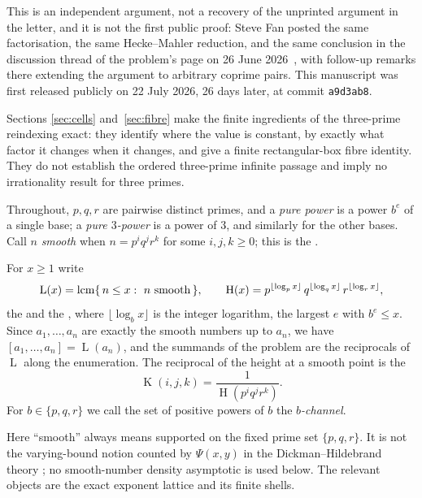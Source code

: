\documentclass[11pt]{article}
\newcommand{\hgt}{\operatorname{H}}
\newcommand{\Lprefix}{\operatorname{L}}
\newcommand{\Kernel}{\operatorname{K}}
\begin{document}
This is an independent argument,
not a recovery of the unprinted argument in the letter, and it is not the
first public proof: Steve Fan posted the same factorisation, the same
Hecke--Mahler reduction, and the same conclusion in the discussion thread of
the problem's page on 26 June 2026~\cite{fan2026comment}, with follow-up
remarks there extending the argument to arbitrary coprime pairs.  This
manuscript was first released publicly on 22 July 2026, 26 days later, at
commit \texttt{a9d3ab8}.

Sections
\ref{sec:cells} and~\ref{sec:fibre} make the finite ingredients of the
three-prime reindexing exact: they identify where the value is constant, by
exactly what factor it changes when it changes, and give a finite
rectangular-box fibre identity.  They do not establish the ordered three-prime
infinite passage and imply no irrationality result for three primes.

Throughout, $p,q,r$ are pairwise distinct primes, and a \emph{pure power} is a
power $b^{e}$ of a single base; a \emph{pure $3$-power} is a power of $3$, and
similarly for the other bases.  Call $n$ \emph{smooth} when
$n=p^{i}q^{j}r^{k}$ for some $i,j,k\ge0$; this is the
.

For $x\ge1$ write
\[
 \Lprefix(x)=\lcm\{\,n\le x:\ n\ \text{smooth}\,\},
 \qquad
 \hgt(x)=p^{\lfloor\log_p x\rfloor}\,q^{\lfloor\log_q x\rfloor}\,
 r^{\lfloor\log_r x\rfloor},
\]
the
 and the
, where $\lfloor\log_b x\rfloor$ is the integer logarithm, the largest
$e$ with $b^{e}\le x$.  Since $a_1,\ldots,a_n$ are exactly the smooth numbers
up to $a_n$, we have $[a_1,\ldots,a_n]=\Lprefix(a_n)$, and the summands of the
problem are the reciprocals of $\Lprefix$ along the enumeration.  The
reciprocal of the height at a smooth point is the
\[
 \Kernel(i,j,k)=\frac{1}{\hgt(p^{i}q^{j}r^{k})} .
\]
For $b\in\{p,q,r\}$ we call the set of positive powers of $b$ the \emph{$b$-channel}.

Here ``smooth'' always means supported on the fixed prime set
\(\{p,q,r\}\).  It is not the varying-bound notion counted by
\(\Psi(x,y)\) in the Dickman--Hildebrand theory
\cite[Theorem~1]{hildebrand1986}; no smooth-number density asymptotic is used
below.  The relevant objects are the exact exponent lattice and its finite
shells.
\end{document}
